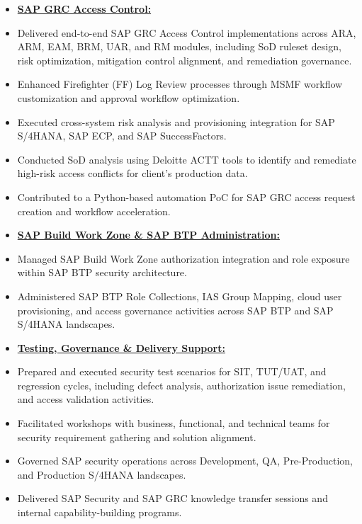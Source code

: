 \documentclass[10pt]{article}
\begin{document}
\begin{itemize}
	\small
    	\item[] \textbf{\underline{SAP GRC Access Control:}}

			\item Delivered end-to-end SAP GRC Access Control implementations across ARA, ARM, EAM, BRM, UAR, and RM modules, including SoD ruleset design, risk optimization, mitigation control alignment, and remediation governance.
			\item Enhanced Firefighter (FF) Log Review processes through MSMF workflow customization and approval workflow optimization.
			\item Executed cross-system risk analysis and provisioning integration for SAP S/4HANA, SAP ECP, and SAP SuccessFactors.
			\item Conducted SoD analysis using Deloitte ACTT tools to identify and remediate high-risk access conflicts for client's production data.
			\item Contributed to a Python-based automation PoC for SAP GRC access request creation and workflow acceleration.
\end{itemize}

\begin{itemize}
	\small
    	\item[] \textbf{\underline{SAP Build Work Zone \& SAP BTP Administration:}}
    			\item Managed SAP Build Work Zone authorization integration and role exposure within SAP BTP security architecture.
			\item Administered SAP BTP Role Collections, IAS Group Mapping, cloud user provisioning, and access governance activities across SAP BTP and SAP S/4HANA landscapes.
\end{itemize}
\begin{itemize}
	\small
    	\item[] \textbf{\underline{Testing, Governance \& Delivery Support:}}
			\item Prepared and executed security test scenarios for SIT, TUT/UAT, and regression cycles, including defect analysis, authorization issue remediation, and access validation activities.
			\item Facilitated workshops with business, functional, and technical teams for security requirement gathering and solution alignment.
			\item Governed SAP security operations across Development, QA, Pre-Production, and Production S/4HANA landscapes.
			\item Delivered SAP Security and SAP GRC knowledge transfer sessions and internal capability-building programs.
\end{itemize}
\end{document}
